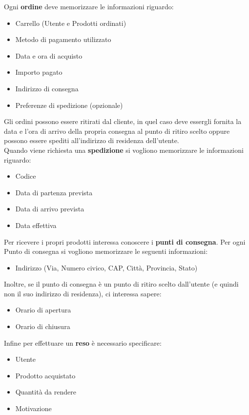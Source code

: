 \documentclass[11pt]{article}
\begin{document}
Ogni \textbf{ordine} deve memorizzare le informazioni riguardo:
\begin{itemize}
    \item Carrello (Utente e Prodotti ordinati)
    \item Metodo di pagamento utilizzato
    \item Data e ora di acquisto
    \item Importo pagato
    \item Indirizzo di consegna
    \item Preferenze di spedizione (opzionale)
\end{itemize}
Gli ordini possono essere ritirati dal cliente, in quel caso deve essergli fornita la data e l’ora di arrivo della propria consegna al punto di ritiro
scelto oppure possono essere spediti all'indirizzo di residenza dell'utente.\\
Quando viene richiesta una \textbf{spedizione} si vogliono memorizzare le informazioni riguardo:
\begin{itemize}
    \item Codice
    \item Data di partenza prevista
    \item Data di arrivo prevista
    \item Data effettiva
\end{itemize}
Per ricevere i propri prodotti interessa conoscere i \textbf{punti di consegna}. Per ogni Punto di consegna si vogliono
memorizzare le seguenti informazioni:
\begin{itemize}
    \item Indirizzo (Via, Numero civico, CAP, Città, Provincia, Stato)
\end{itemize}
Inoltre, se il punto di consegna è un punto di ritiro scelto dall'utente (e quindi non il suo indirizzo di residenza), ci interessa sapere:
\begin{itemize}
    \item Orario di apertura
    \item Orario di chiusura
\end{itemize}
Infine per effettuare un \textbf{reso} è necessario specificare:
\begin{itemize}
    \item Utente
    \item Prodotto acquistato
    \item Quantità da rendere
    \item Motivazione 
\end{itemize}
\end{document}

